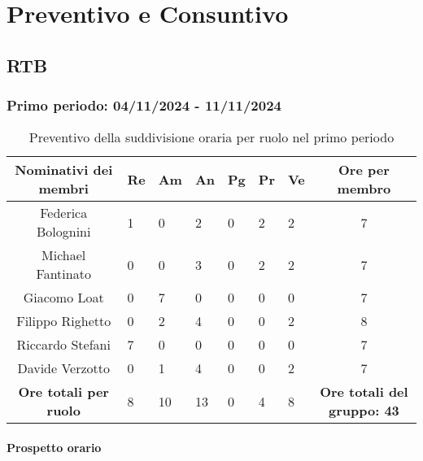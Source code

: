 \setcounter{secnumdepth}{5} %
\section{Preventivo e Consuntivo}
\label{sec:preventivo e consuntivo}

\subsection{RTB}

\subsubsection{Primo periodo: 04/11/2024 - 11/11/2024}

\begin{table}[h!]
    \centering
    \renewcommand{\arraystretch}{1.5}
    \begin{tabularx}{\textwidth}{|c|X|X|X|X|X|X|c|}\hline
    \rowcolor[HTML]{FFD700} 
    \textbf{Nominativi dei membri} & \textbf{Re} & \textbf{Am} & \textbf{An} & \textbf{Pg} & \textbf{Pr} & \textbf{Ve} & \textbf{Ore per membro} \\ \hline
    Federica Bolognini & 1 & 0 & 2 & 0 & 2 & 2 & 7 \\ \hline
    Michael Fantinato & 0 & 0 & 3 & 0 & 2 & 2 & 7 \\ \hline
    Giacomo Loat & 0 & 7 & 0 & 0 & 0 & 0 & 7 \\ \hline
    Filippo Righetto & 0 & 2 & 4 & 0 & 0 & 2 & 8 \\ \hline
    Riccardo Stefani & 7 & 0 & 0 & 0 & 0 & 0 & 7 \\ \hline
    Davide Verzotto & 0 & 1 & 4 & 0 & 0 & 2 & 7 \\ \hline
    \rowcolor[HTML]{FFD700} 
    \textbf{Ore totali per ruolo} & 8 & 10 & 13 & 0 & 4 & 8 & \textbf{Ore totali del gruppo: 43} \\ \hline
    \end{tabularx}
    \caption{Preventivo della suddivisione oraria per ruolo nel primo periodo}
\end{table}





\paragraph{Prospetto orario}
